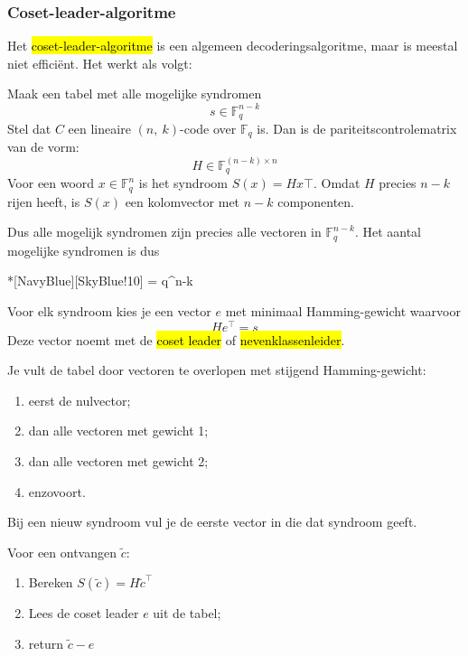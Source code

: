 \subsubsection{Coset-leader-algoritme}

Het \hl{coset-leader-algoritme} is een algemeen decoderingsalgoritme, maar is meestal niet efficiënt. Het werkt als volgt:


Maak een tabel met alle mogelijke syndromen
\begin{equation*}
    s \in \mathbb{F}_q^{n-k}
\end{equation*}
Stel dat $C$ een lineaire $(n,\ k)$-code over $\mathbb{F}_q$ is. Dan is de pariteitscontrolematrix van de vorm:
\begin{equation*}
    H \in \mathbb{F}_q^{(n-k) \times n}
\end{equation*}
Voor een woord $x \in \mathbb{F}_q^n$ is het syndroom $S(x) = Hx\top$. Omdat $H$ precies $n-k$ rijen heeft, is $S(x)$ een kolomvector met $n-k$ componenten.

Dus alle mogelijk syndromen zijn precies alle vectoren in $\mathbb{F}_q^{n-k}$. Het aantal mogelijke syndromen is dus
\begin{equationbox}*[NavyBlue][SkyBlue!10]
     = q^{n-k}
\end{equationbox}

Voor elk syndroom kies je een vector $e$ met minimaal Hamming-gewicht waarvoor
\begin{equation*}
    He^\top = s
\end{equation*}
Deze vector noemt met de \hl{coset leader} of \hl{nevenklassenleider}.

Je vult de tabel door vectoren te overlopen met stijgend Hamming-gewicht:
\begin{enumerate}
    \item eerst de nulvector;
    \item dan alle vectoren met gewicht 1;
    \item dan alle vectoren met gewicht 2;
    \item enzovoort.
\end{enumerate}
Bij een nieuw syndroom vul je de eerste vector in die dat syndroom geeft.


Voor een ontvangen $\tilde{c}$:
\begin{enumerate}
    \item Bereken $S(\tilde{c}) = H\tilde{c}^\top$
    \item Lees de coset leader $e$ uit de tabel;
    \item return $\tilde{c} - e$
\end{enumerate}

